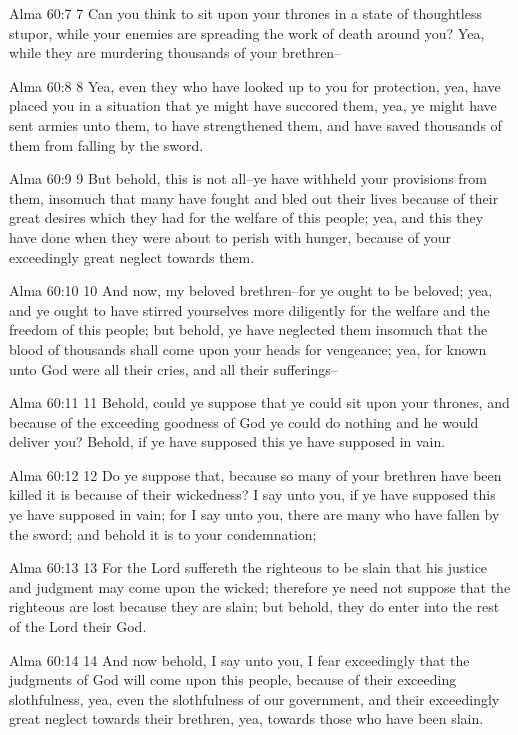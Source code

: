 Alma 60:7
 7 Can you think to sit upon your thrones in a state of
thoughtless stupor, while your enemies are spreading the work of
death around you? Yea, while they are murdering thousands of
your brethren--

Alma 60:8
 8 Yea, even they who have looked up to you for protection, yea,
have placed you in a situation that ye might have succored them,
yea, ye might have sent armies unto them, to have strengthened
them, and have saved thousands of them from falling by the sword.

Alma 60:9
 9 But behold, this is not all--ye have withheld your provisions
from them, insomuch that many have fought and bled out their
lives because of their great desires which they had for the
welfare of this people; yea, and this they have done when they
were about to perish with hunger, because of your exceedingly
great neglect towards them.

Alma 60:10
 10 And now, my beloved brethren--for ye ought to be beloved;
yea, and ye ought to have stirred yourselves more diligently for
the welfare and the freedom of this people; but behold, ye have
neglected them insomuch that the blood of thousands shall come
upon your heads for vengeance; yea, for known unto God were all
their cries, and all their sufferings--

Alma 60:11
 11 Behold, could ye suppose that ye could sit upon your thrones,
and because of the exceeding goodness of God ye could do nothing
and he would deliver you? Behold, if ye have supposed this ye
have supposed in vain.

Alma 60:12
 12 Do ye suppose that, because so many of your brethren have
been killed it is because of their wickedness? I say unto you,
if ye have supposed this ye have supposed in vain; for I say unto
you, there are many who have fallen by the sword; and behold it
is to your condemnation;

Alma 60:13
 13 For the Lord suffereth the righteous to be slain that his
justice and judgment may come upon the wicked; therefore ye need
not suppose that the righteous are lost because they are slain;
but behold, they do enter into the rest of the Lord their God.

Alma 60:14
 14 And now behold, I say unto you, I fear exceedingly that the
judgments of God will come upon this people, because of their
exceeding slothfulness, yea, even the slothfulness of our
government, and their exceedingly great neglect towards their
brethren, yea, towards those who have been slain.

